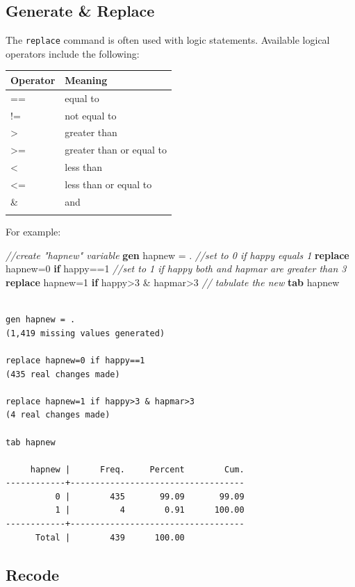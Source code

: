 \documentclass[
]{book}
\newenvironment{Shaded}{\begin{snugshade}}{\end{snugshade}}
\newcommand{\CommentTok}[1]{\textcolor[rgb]{0.56,0.35,0.01}{\textit{#1}}}
\newcommand{\KeywordTok}[1]{\textcolor[rgb]{0.13,0.29,0.53}{\textbf{#1}}}
\newcommand{\NormalTok}[1]{#1}
\begin{document}
\hypertarget{generate-replace}{%
\subsection{Generate \& Replace}\label{generate-replace}}

The \texttt{replace} command is often used with logic statements. Available logical operators include the following:

\begin{longtable}[]{@{}ll@{}}
\toprule
Operator & Meaning\tabularnewline
\midrule
\endhead
== & equal to\tabularnewline
!= & not equal to\tabularnewline
\textgreater{} & greater than\tabularnewline
\textgreater= & greater than or equal to\tabularnewline
\textless{} & less than\tabularnewline
\textless= & less than or equal to\tabularnewline
\& & and\tabularnewline
&\tabularnewline
\bottomrule
\end{longtable}

For example:

\begin{Shaded}
\begin{Highlighting}[]
  \CommentTok{//create "hapnew" variable}
  \KeywordTok{gen}\NormalTok{ hapnew = .}
  \CommentTok{//set to 0 if happy equals 1}
  \KeywordTok{replace}\NormalTok{ hapnew=0 }\KeywordTok{if}\NormalTok{ happy==1 }
  \CommentTok{//set to 1 if happy both and hapmar are greater than 3}
  \KeywordTok{replace}\NormalTok{ hapnew=1 }\KeywordTok{if}\NormalTok{ happy>3 & hapmar>3 }
  \CommentTok{// tabulate the new }
  \KeywordTok{tab}\NormalTok{ hapnew}
\end{Highlighting}
\end{Shaded}

\begin{verbatim}

gen hapnew = .
(1,419 missing values generated)

replace hapnew=0 if happy==1 
(435 real changes made)

replace hapnew=1 if happy>3 & hapmar>3 
(4 real changes made)

tab hapnew

     hapnew |      Freq.     Percent        Cum.
------------+-----------------------------------
          0 |        435       99.09       99.09
          1 |          4        0.91      100.00
------------+-----------------------------------
      Total |        439      100.00
\end{verbatim}

\hypertarget{recode}{%
\subsection{Recode}\label{recode}}
\end{document}
